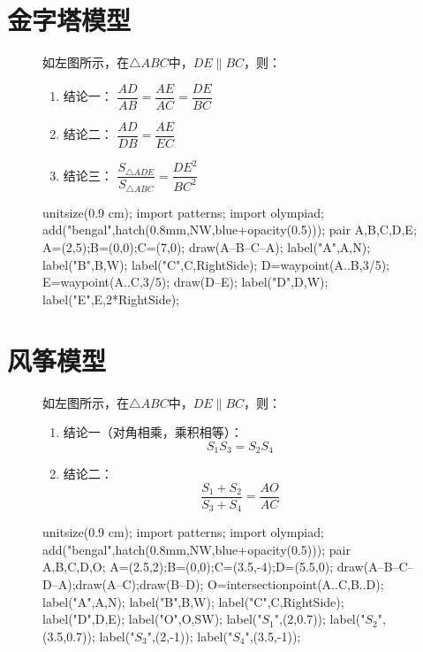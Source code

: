 \documentclass[12pt,space]{ctexart} %
\begin{document}
\section{金字塔模型}
\begin{figure}[ht]
	\begin{minipage}[b]{0.45\textwidth}
		如左图所示，在$\triangle ABC$中，$DE\parallel BC$，则：
		\begin{enumerate}
			\item 结论一： $\dfrac{AD}{AB}=\dfrac{AE}{AC}=\dfrac{DE}{BC}$
			\item 结论二： $\dfrac{AD}{DB}=\dfrac{AE}{EC}$
			\item 结论三： $\dfrac{S_{\triangle ADE}}{S_{\triangle ABC}}=\dfrac{DE^2}{BC^2}$
		\end{enumerate}
	\end{minipage}
	\qquad
	\begin{minipage}[b]{0.45\textwidth}
		\begin{asy}
			unitsize(0.9 cm);
			import patterns;
			import olympiad;
			add("bengal",hatch(0.8mm,NW,blue+opacity(0.5)));
			pair A,B,C,D,E;
			A=(2,5);B=(0,0);C=(7,0);
			draw(A--B--C--A);
			label("A",A,N);
			label("B",B,W);
			label("C",C,RightSide);
			D=waypoint(A..B,3/5);
			E=waypoint(A..C,3/5);
			draw(D--E);
			label("D",D,W);
			label("E",E,2*RightSide);
		\end{asy}
	\end{minipage}
\end{figure}
\vspace{1cm}
\section{风筝模型}
\begin{figure}[ht]
	\begin{minipage}[b]{0.45\textwidth}
		如左图所示，在$\triangle ABC$中，$DE\parallel BC$，则：
		\begin{enumerate}
			\item 结论一（对角相乘，乘积相等）：
			      $$S_1 S_3=S_2 S_4$$
			\item 结论二：
			      $$\frac{S_1+S_2}{S_3+S_4}=\frac{AO}{AC}$$
		\end{enumerate}
	\end{minipage}
	\qquad
	\begin{minipage}[b]{0.45\textwidth}
		\begin{asy}
			unitsize(0.9 cm);
			import patterns;
			import olympiad;
			add("bengal",hatch(0.8mm,NW,blue+opacity(0.5)));
			pair A,B,C,D,O;
			A=(2.5,2);B=(0,0);C=(3.5,-4);D=(5.5,0);
			draw(A--B--C--D--A);draw(A--C);draw(B--D);
			O=intersectionpoint(A..C,B..D);
			label("A",A,N);
			label("B",B,W);
			label("C",C,RightSide);
			label("D",D,E);
			label("O",O,SW);
			label("$S_1$",(2,0.7));
			label("$S_2$",(3.5,0.7));
			label("$S_3$",(2,-1));
			label("$S_4$",(3.5,-1));
		\end{asy}
	\end{minipage}
\end{figure}
\vspace{2cm}
\end{document}
